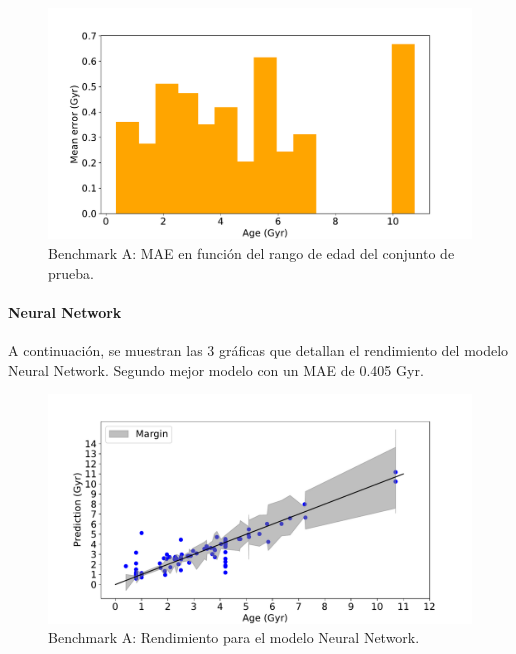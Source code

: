 \begin{figure}[H]
\begin{center}
 \includegraphics[width=0.8\linewidth]{Figuras/Experimentos/B_A_stacking_3.pdf}
\end{center}
\caption{Benchmark A: MAE en función del rango de edad del conjunto de prueba.}
 \label{fig:benchA_details_stacking_3}
\end{figure}

\paragraph{Neural Network} 
A continuación, se muestran las 3 gráficas que detallan el rendimiento del modelo Neural Network. Segundo mejor modelo con un MAE de 0.405 Gyr.

\begin{figure}[H]
\begin{center}
 \includegraphics[width=0.8\linewidth]{Figuras/Experimentos/B_A_nnet_1.pdf}
\end{center}
\caption{Benchmark A: Rendimiento para el modelo Neural Network.}
 \label{fig:benchA_details_nnet_1}
\end{figure}

